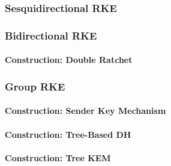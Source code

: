 \documentclass[a4paper,orivec]{llncs}
\begin{document}
\subsubsection{Sesquidirectional RKE}

\subsubsection{Bidirectional RKE}

\paragraph{Construction: Double Ratchet}

\subsubsection{Group RKE}

\paragraph{Construction: Sender Key Mechanism}

\paragraph{Construction: Tree-Based DH}

\paragraph{Construction: Tree KEM}


\end{document}
